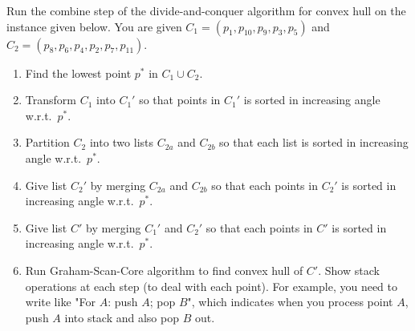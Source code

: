 \documentclass[11pt]{article}
\begin{document}
\begin{qunlist}

Run the combine step of the divide-and-conquer algorithm for convex hull
on the instance given below. You are given $C_1 = (p_1, p_{10}, p_9, p_3, p_5)$
and $C_2 = (p_8, p_{6}, p_4, p_2, p_7, p_{11})$.
\begin{enumerate}
\item Find the lowest point $p^*$ in $C_1\cup C_2$.
\item Transform $C_1$ into $C_1'$ so that points in $C_1'$ is sorted in increasing angle w.r.t.\ $p^*$.
\item Partition $C_2$ into two lists $C_{2a}$ and $C_{2b}$ so that each list is sorted in increasing angle w.r.t.\ $p^*$.
\item Give list $C_2'$ by merging $C_{2a}$ and $C_{2b}$ so that each points in $C_2'$ is sorted in increasing angle w.r.t.\ $p^*$.
\item Give list $C'$ by merging $C_1'$ and $C_2'$ so that each points in $C'$ is sorted in increasing angle w.r.t.\ $p^*$.
\item Run Graham-Scan-Core algorithm to find convex hull of $C'$.
Show stack operations at each step (to deal with each point). For example,
you need to write like "For $A$: push $A$; pop $B$", which indicates when
you process point $A$, push $A$ into stack and also pop $B$ out.
\end{enumerate}


\end{qunlist}
\end{document}
